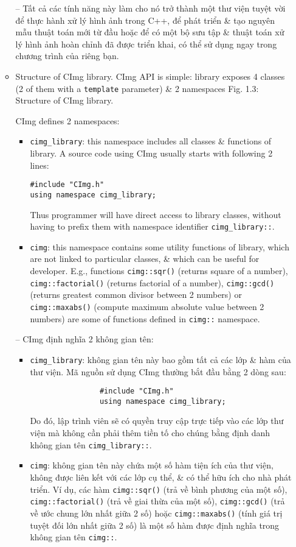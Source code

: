 \documentclass{article}
\begin{document}
\begin{itemize}
\begin{itemize}
        -- Tất cả các tính năng này làm cho nó trở thành một thư viện tuyệt vời để thực hành xử lý hình ảnh trong C++, để phát triển \& tạo nguyên mẫu thuật toán mới từ đầu hoặc để có một bộ sưu tập \& thuật toán xử lý hình ảnh hoàn chỉnh đã được triển khai, có thể sử dụng ngay trong chương trình của riêng bạn.        
        \item {\sf Structure of CImg library.} CImg API is simple: library exposes 4 classes (2 of them with a {\tt template} parameter) \& 2 namespaces {\sf Fig. 1.3: Structure of CImg library}.
        
        CImg defines 2 namespaces:
        \begin{itemize}
            \item \verb|cimg_library|: this namespace includes all classes \& functions of library. A source code using CImg usually starts with following 2 lines:
            \begin{verbatim}
#include "CImg.h"
using namespace cimg_library;
            \end{verbatim}
            Thus programmer will have direct access to library classes, without having to prefix them with namespace identifier \verb|cimg_library::|.
            \item {\tt cimg}: this namespace contains some utility functions of library, which are not linked to particular classes, \& which can be useful for developer. E.g., functions {\tt cimg::sqr()} (returns square of a number), {\tt cimg::factorial()} (returns factorial of a number), {\tt cimg::gcd()} (returns greatest common divisor between 2 numbers) or {\tt cimg::maxabs()} (compute maximum absolute value between 2 numbers) are some of functions defined in {\tt cimg::} namespace.
        \end{itemize}
        -- CImg định nghĩa 2 không gian tên:
        \begin{itemize}
            \item \verb|cimg_library|: không gian tên này bao gồm tất cả các lớp \& hàm của thư viện. Mã nguồn sử dụng CImg thường bắt đầu bằng 2 dòng sau:
            \begin{verbatim}
                #include "CImg.h"
                using namespace cimg_library;
            \end{verbatim}
            Do đó, lập trình viên sẽ có quyền truy cập trực tiếp vào các lớp thư viện mà không cần phải thêm tiền tố cho chúng bằng định danh không gian tên \verb|cimg_library::|.
            \item {\tt cimg}: không gian tên này chứa một số hàm tiện ích của thư viện, không được liên kết với các lớp cụ thể, \& có thể hữu ích cho nhà phát triển. Ví dụ, các hàm {\tt cimg::sqr()} (trả về bình phương của một số), {\tt cimg::factorial()} (trả về giai thừa của một số), {\tt cimg::gcd()} (trả về ước chung lớn nhất giữa 2 số) hoặc {\tt cimg::maxabs()} (tính giá trị tuyệt đối lớn nhất giữa 2 số) là một số hàm được định nghĩa trong không gian tên {\tt cimg::}.

\end{itemize}
\end{itemize}
\end{itemize}
\end{document}
